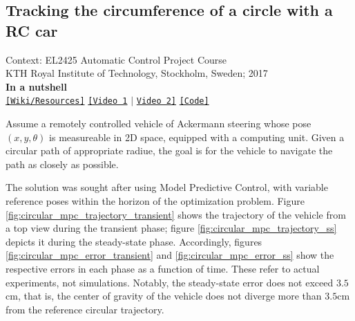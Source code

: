 \subsection{Tracking the circumference of a circle with a RC car}

\noindent Context: EL2425 Automatic Control Project Course\\
\noindent KTH Royal Institute of Technology, Stockholm, Sweden; 2017\\

\noindent \textbf{In a nutshell}\\
\noindent \href{https://github.com/li9i/HT16_P2_EL2425_resources}{\texttt{[Wiki/Resources]}} \href{https://www.youtube.com/watch?v=Vh1huYlyD_8}{\texttt{[Video 1}} $|$ \href{https://youtu.be/937OZez1iN8?t=69}{\texttt{Video 2]}} \href{https://github.com/li9i/HT16_P2_EL2425}{\texttt{[Code]}} \\


\begin{problem}
Assume a remotely controlled vehicle of Ackermann steering whose pose
$(x,y,\theta)$ is measureable in 2D space, equipped with a computing unit.
Given a circular path of appropriate radiue, the goal is for the vehicle to
navigate the path as closely as possible.
\end{problem}

The solution was sought after using Model Predictive Control, with variable
reference poses within the horizon of the optimization problem. Figure
\ref{fig:circular_mpc_trajectory_transient} shows the trajectory of the vehicle
from a top view during the transient phase; figure
\ref{fig:circular_mpc_trajectory_ss} depicts it during the steady-state phase.
Accordingly, figures \ref{fig:circular_mpc_error_transient} and
\ref{fig:circular_mpc_error_ss} show the respective errors in each phase as a
function of time. These refer to actual experiments, not simulations.  Notably,
the steady-state error does not exceed $3.5$cm, that is, the center of gravity
of the vehicle does not diverge more than $3.5$cm from the reference circular
trajectory.

